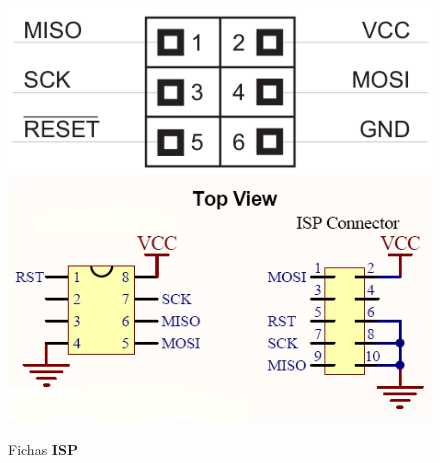 \begin{minipage}[!b]{.5\linewidth}
	\begin{figure}[H]
		\captionsetup{justification=raggedright,singlelinecheck=false}
		\flushleft
		\includegraphics[scale=0.45]{./image/PESTA/programador/isp_6pin.png}
		\hspace{.3cm}
		\includegraphics[scale=0.5]{./image/PESTA/programador/isp_8e10pin.png}
		\caption{Fichas \textbf{ISP}}
		\label{ISP_6_8_10pin}
	\end{figure}
\end{minipage}
